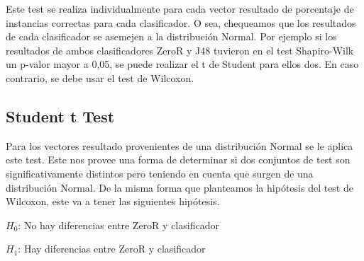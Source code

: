 Este test se realiza individualmente para cada vector resultado de porcentaje de instancias correctas para cada clasificador. O sea, chequeamos que los resultados de cada clasificador se asemejen a la distribución Normal. Por ejemplo si los resultados de ambos clasificadores ZeroR y J48 tuvieron en el test Shapiro-Wilk un p-valor mayor a 0,05, se puede realizar el t de Student para ellos dos. En caso contrario, se debe usar el test de Wilcoxon.

\subsection{Student t Test}



Para los vectores resultado provenientes de una distribución Normal se le aplica este test. Este nos provee una forma de determinar si dos conjuntos de test son significativamente distintos pero teniendo en cuenta que surgen de una distribución Normal. De la misma forma que planteamos la hipótesis del test de Wilcoxon, este va a tener las siguientes hipótesis. 

\vspace{0.5cm}
\hspace{2cm}$H_0$: No hay diferencias entre ZeroR y clasificador
\vspace{0.25cm}

\hspace{2cm}$H_1$: Hay diferencias entre ZeroR y clasificador
\vspace{0.5cm}

